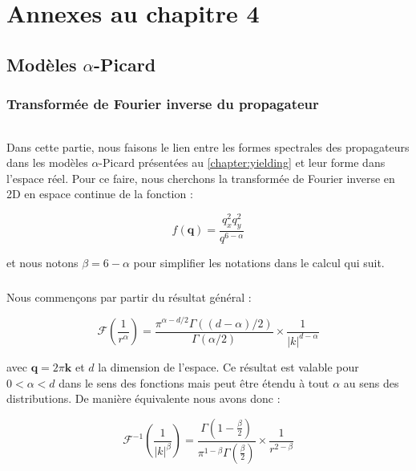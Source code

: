 \FloatBarrier

\chapter{Annexes au chapitre 4}



\section{Modèles $\alpha$-Picard}

\stoptocwriting

\subsection{Transformée de Fourier inverse du propagateur}

\label{sec:TFinverse}

\subparagraph{}Dans cette partie, nous faisons le lien entre les formes spectrales des propagateurs dans les modèles $\alpha$-Picard présentées au \autoref{chapter:yielding} et leur forme dans l'espace réel. Pour ce faire, nous cherchons la transformée de Fourier inverse en 2D en espace continue de la fonction :

\begin{equation}
	f(\mathbf{q}) = \frac{q_x^2 q_y^2}{q^{6-\alpha}}
\end{equation}

\noindent et nous notons $\beta = 6 - \alpha$ pour simplifier les notations dans le calcul qui suit.

\paragraph{}Nous commençons par partir du résultat général :

\begin{equation}
    \mathcal{F}\left( \frac{1}{r^\alpha} \right)=\frac{\pi^{\alpha-d / 2} \Gamma((d-\alpha) / 2)}{\Gamma(\alpha / 2)} \times\frac{1}{|k|^{d-\alpha}}
\end{equation}

\noindent avec $\mathbf{q} = 2\pi \mathbf{k}$ et $d$ la dimension de l'espace. Ce résultat est valable pour $0<\alpha<d$ dans le sens des fonctions mais peut être étendu à tout $\alpha$ au sens des distributions. De manière équivalente nous avons donc :

\begin{equation}
    \mathcal{F}^{-1}\left( \frac{1}{\lvert k \rvert^\beta} \right) = \frac{\Gamma\left( 1-\frac{\beta}{2} \right)}{\pi^{1-\beta}\Gamma\left( \frac{\beta}{2} \right)}\times\frac{1}{r^{2-\beta}}
\end{equation}


